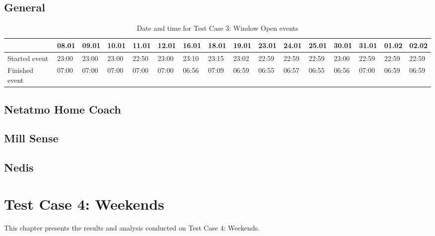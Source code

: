 \subsection{General}
\begin{table}[!hbtp]
    \centering
    \caption{Date and time for Test Case 3: Window Open events}
    \begin{adjustbox}{width=1\textwidth} 
            \begin{tabular}{l|l|l|l|l|l|l|l|l|l|l|l|l|l|l|l|}
                \cline{2-16}
                & 08.01 & 09.01 & 10.01 & 11.01 & 12.01 & 16.01 & 18.01 & 19.01 & 23.01 & 24.01 & 25.01 & 30.01 & 31.01 & 01.02 & 02.02 \\ \hline
                \multicolumn{1}{|l|}{Started event}  & 23:00 & 23:00 & 23:00 & 22:50 & 23:00 & 23:10 & 23:15 & 23:02 & 22:59 & 22:59 & 22:59 & 23:00 & 22:59 & 22:59 & 22:59 \\ \hline
                \multicolumn{1}{|l|}{Finished event} & 07:00 & 07:00 & 07:00 & 07:00 & 07:00 & 06:56 & 07:09 & 06:59 & 06:55 & 06:57 & 06:55 & 06:56 & 07:00 & 06:59 & 06:59 \\ \hline
            \end{tabular}
    \end{adjustbox}
    \label{tab:WindowDates}
\end{table}
\subsection{Netatmo Home Coach}
\subsection{Mill Sense}
\subsection{Nedis}

\section{Test Case 4: Weekends}
This chapter presents the results and analysis conducted on Test Case 4: Weekends. 
